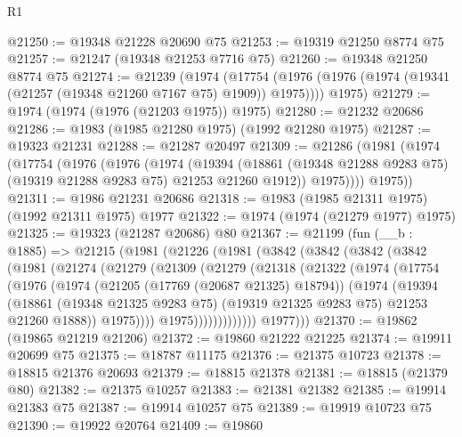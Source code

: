 \begin{lexlean}{R1}
\begin{coremodule}
@21250 := @19348 @21228 @20690 @75
@21253 := @19319 @21250 @8774 @75
@21257 := @21247 (@19348 @21253 @7716 @75)
@21260 := @19348 @21250 @8774 @75
@21274 := @21239
    (@1974
      (@17754 (@1976 (@1976 (@1974 (@19341 (@21257 (@19348 @21260 @7167 @75) @1909)) @1975))))
      @1975)
@21279 := @1974 (@1974 (@1976 (@21203 @1975)) @1975)
@21280 := @21232 @20686
@21286 := @1983 (@1985 @21280 @1975) (@1992 @21280 @1975)
@21287 := @19323 @21231
@21288 := @21287 @20497
@21309 := @21286
    (@1981
      (@1974
        (@17754
          (@1976
            (@1976
              (@1974
                (@19394
                  (@18861 (@19348 @21288 @9283 @75) (@19319 @21288 @9283 @75) @21253 @21260 @1912))
                @1975))))
        @1975))
@21311 := @1986 @21231 @20686
@21318 := @1983 (@1985 @21311 @1975) (@1992 @21311 @1975) @1977
@21322 := @1974 (@1974 (@21279 @1977) @1975)
@21325 := @19323 (@21287 @20686) @80
@21367 := @21199
    (fun (__b : @1885) =>
    @21215
      (@1981
        (@21226
          (@1981
            (@3842
              (@3842
                (@3842
                  (@3842
                    (@1981
                      (@21274
                        (@21279
                          (@21309
                            (@21279
                              (@21318
                                (@21322
                                  (@1974
                                    (@17754
                                      (@1976
                                        (@1974
                                          (@21205 (@17769 (@20687 @21325) @18794))
                                          (@1974
                                            (@19394
                                              (@18861
                                                (@19348 @21325 @9283 @75)
                                                (@19319 @21325 @9283 @75)
                                                @21253
                                                @21260
                                                @1888))
                                            @1975))))
                                    @1975)))))))))))))
          @1977)))
@21370 := @19862 (@19865 @21219 @21206)
@21372 := @19860 @21222 @21225
@21374 := @19911 @20699 @75
@21375 := @18787 @11175
@21376 := @21375 @10723
@21378 := @18815 @21376 @20693
@21379 := @18815 @21378
@21381 := @18815 (@21379 @80)
@21382 := @21375 @10257
@21383 := @21381 @21382
@21385 := @19914 @21383 @75
@21387 := @19914 @10257 @75
@21389 := @19919 @10723 @75
@21390 := @19922 @20764
@21409 := @19860

\end{coremodule}
\end{lexlean}
